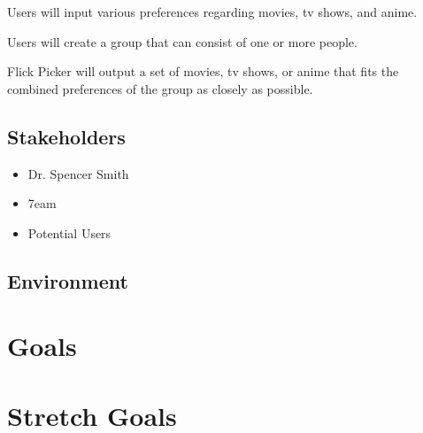 \documentclass{article}
\begin{document}
Users will input various preferences regarding movies, tv shows, and anime. 

Users will create a group that can consist of one or more people.

Flick Picker will output a set of movies, tv shows, or anime that fits the combined preferences of the group as closely as possible.

\subsection{Stakeholders}

\begin{itemize}
	\item Dr. Spencer Smith
	\item 7eam
	\item Potential Users
\end{itemize}

\subsection{Environment}


\section{Goals}

\section{Stretch Goals}
\end{document}
